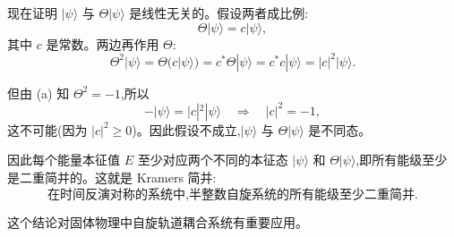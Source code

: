 \begin{solution}
		现在证明 $|\psi\rangle$ 与 $\Theta|\psi\rangle$ 是线性无关的。假设两者成比例:
		\[
		\Theta|\psi\rangle = c|\psi\rangle,
		\]
		其中 $c$ 是常数。两边再作用 $\Theta$:
		\[
		\Theta^2|\psi\rangle = \Theta(c|\psi\rangle) = c^*\Theta|\psi\rangle = c^*c|\psi\rangle = |c|^2|\psi\rangle.
		\]

		但由 (a) 知 $\Theta^2=-1$,所以
		\[
		-|\psi\rangle = |c|^2|\psi\rangle \quad\Longrightarrow\quad |c|^2 = -1,
		\]
		这不可能(因为 $|c|^2\ge0$)。因此假设不成立,$|\psi\rangle$ 与 $\Theta|\psi\rangle$ 是不同态。

		因此每个能量本征值 $E$ 至少对应两个不同的本征态 $|\psi\rangle$ 和 $\Theta|\psi\rangle$,即所有能级至少是二重简并的。这就是 Kramers 简并:
		\[
		\boxed{\text{在时间反演对称的系统中,半整数自旋系统的所有能级至少二重简并}}.
		\]

		这个结论对固体物理中自旋轨道耦合系统有重要应用。
		\end{solution}

